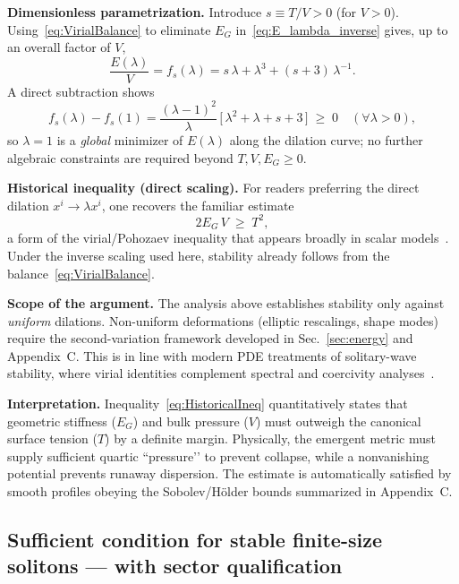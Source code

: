\documentclass{article}
\begin{document}
\textbf{Dimensionless parametrization.}
Introduce $s\equiv T/V>0$ (for $V>0$). Using~\eqref{eq:VirialBalance} to eliminate $E_G$ in~\eqref{eq:E_lambda_inverse} gives, up to an overall factor of $V$,
\begin{equation}
\frac{E(\lambda)}{V}= f_s(\lambda)
= s\,\lambda + \lambda^{3} + (s+3)\,\lambda^{-1}.
\label{eq:fs_def}
\end{equation}
A direct subtraction shows
\begin{equation}
f_s(\lambda) - f_s(1)
= \frac{(\lambda-1)^2}{\lambda}\,\big[\,\lambda^{2}+\lambda+s+3\,\big] \;\ge\;0 \quad (\forall \lambda>0),
\end{equation}
so $\lambda=1$ is a \emph{global} minimizer of $E(\lambda)$ along the dilation curve; no further algebraic constraints are required beyond $T,V,E_G\ge0$.

\textbf{Historical inequality (direct scaling).}
For readers preferring the direct dilation $x^i\!\to\!\lambda x^i$, one recovers the familiar estimate
\begin{equation}
2E_G\,V \;\ge\; T^2,
\label{eq:HistoricalIneq}
\end{equation}
a form of the virial/Pohozaev inequality that appears broadly in scalar models~\cite{Pombo2024_Virial}. Under the inverse scaling used here, stability already follows from the balance~\eqref{eq:VirialBalance}.

\textbf{Scope of the argument.}
The analysis above establishes stability only against \emph{uniform} dilations. Non-uniform deformations (elliptic rescalings, shape modes) require the second-variation framework developed in Sec.~\ref{sec:energy} and Appendix~C. This is in line with modern PDE treatments of solitary-wave stability, where virial identities complement spectral and coercivity analyses~\cite{Germain2024_Review}.

\textbf{Interpretation.}
Inequality~\eqref{eq:HistoricalIneq} quantitatively states that geometric stiffness ($E_G$) and bulk pressure ($V$) must outweigh the canonical surface tension ($T$) by a definite margin. Physically, the emergent metric must supply sufficient quartic “pressure’’ to prevent collapse, while a nonvanishing potential prevents runaway dispersion. The estimate is automatically satisfied by smooth profiles obeying the Sobolev/Hölder bounds summarized in Appendix~C.

\subsection{Sufficient condition for stable finite-size solitons — with sector qualification}
\label{subsec:SufficientCondition}
\end{document}
